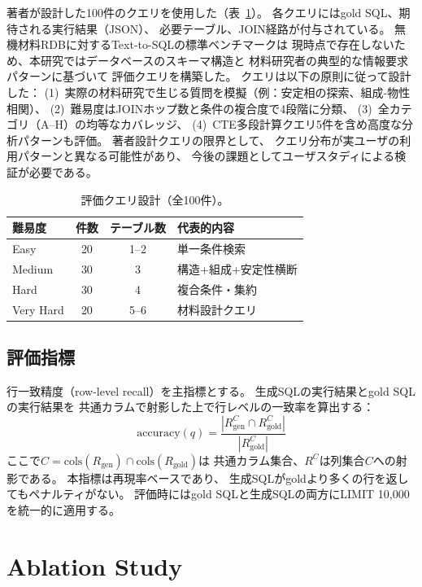 \documentclass[5p,twocolumn]{elsarticle}
\begin{document}
著者が設計した100件のクエリを使用した（表~\ref{tab:query_design}）。
各クエリにはgold SQL、期待される実行結果（JSON）、
必要テーブル、JOIN経路が付与されている。
無機材料RDBに対するText-to-SQLの標準ベンチマークは
現時点で存在しないため、本研究ではデータベースのスキーマ構造と
材料研究者の典型的な情報要求パターンに基づいて
評価クエリを構築した。
クエリは以下の原則に従って設計した：
(1)~実際の材料研究で生じる質問を模擬（例：安定相の探索、組成-物性相関）、
(2)~難易度はJOINホップ数と条件の複合度で4段階に分類、
(3)~全カテゴリ（A--H）の均等なカバレッジ、
(4)~CTE多段計算クエリ5件を含め高度な分析パターンも評価。
著者設計クエリの限界として、
クエリ分布が実ユーザの利用パターンと異なる可能性があり、
今後の課題としてユーザスタディによる検証が必要である。

\begin{table}[t]
  \centering
  \caption{評価クエリ設計（全100件）。}
  \label{tab:query_design}
  \small
  \begin{tabular}{@{}lccl@{}}
    \toprule
    難易度 & 件数 & テーブル数 & 代表的内容 \\
    \midrule
    Easy & 20 & 1--2 & 単一条件検索 \\
    Medium & 30 & 3 & 構造+組成+安定性横断 \\
    Hard & 30 & 4 & 複合条件・集約 \\
    Very Hard & 20 & 5--6 & 材料設計クエリ \\
    \bottomrule
  \end{tabular}
\end{table}

\subsection{評価指標}

行一致精度（row-level recall）を主指標とする。
生成SQLの実行結果とgold SQLの実行結果を
共通カラムで射影した上で行レベルの一致率を算出する：
\begin{equation}
  \text{accuracy}(q) = \frac{|R_\text{gen}^{C} \cap R_\text{gold}^{C}|}{|R_\text{gold}^{C}|}
  \label{eq:column_aware}
\end{equation}
ここで$C = \text{cols}(R_\text{gen}) \cap \text{cols}(R_\text{gold})$は
共通カラム集合、$R^C$は列集合$C$への射影である。
本指標は再現率ベースであり、
生成SQLがgoldより多くの行を返してもペナルティがない。
評価時にはgold SQLと生成SQLの両方にLIMIT 10{,}000を統一的に適用する。

\section{Ablation Study}
\label{sec:ablation}
\end{document}
